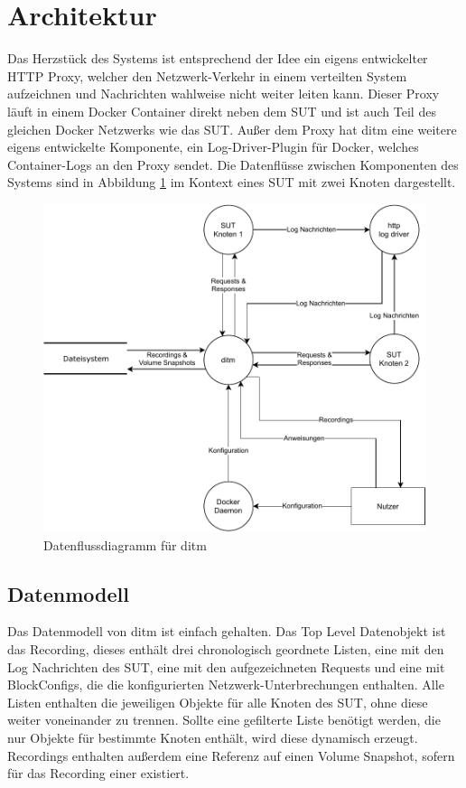 \documentclass[12pt,a4paper]{report}
\begin{document}
\section{Architektur}
Das Herzstück des Systems ist entsprechend der Idee ein eigens entwickelter HTTP Proxy, welcher den Netzwerk-Verkehr in einem
verteilten System aufzeichnen und Nachrichten wahlweise nicht weiter leiten kann. Dieser Proxy läuft in einem Docker Container
direkt neben dem SUT und ist auch Teil des gleichen Docker Netzwerks wie das SUT. Außer dem Proxy hat ditm eine weitere eigens
entwickelte Komponente, ein Log-Driver-Plugin für Docker, welches Container-Logs an den Proxy sendet. Die Datenflüsse zwischen
Komponenten des Systems sind in Abbildung \ref{fig:dataflow} im Kontext eines SUT mit zwei Knoten dargestellt.
\begin{figure}[H]
	\centering
	\includegraphics[width=\linewidth]{img/ditm-Dataflow.pdf}
	\caption{Datenflussdiagramm für ditm}
	\label{fig:dataflow}
\end{figure}

\subsection{Datenmodell}
Das Datenmodell von ditm ist einfach gehalten. Das Top Level Datenobjekt ist das Recording, dieses enthält drei chronologisch
geordnete Listen, eine mit den Log Nachrichten des SUT, eine mit den aufgezeichneten Requests und eine mit BlockConfigs, die die
konfigurierten Netzwerk-Unterbrechungen enthalten. Alle Listen enthalten die jeweiligen Objekte für alle Knoten des SUT, ohne
diese weiter voneinander zu trennen. Sollte eine gefilterte Liste benötigt werden, die nur Objekte für bestimmte Knoten enthält,
wird diese dynamisch erzeugt. Recordings enthalten außerdem eine Referenz auf einen Volume Snapshot, sofern für das Recording
einer existiert.
\end{document}
